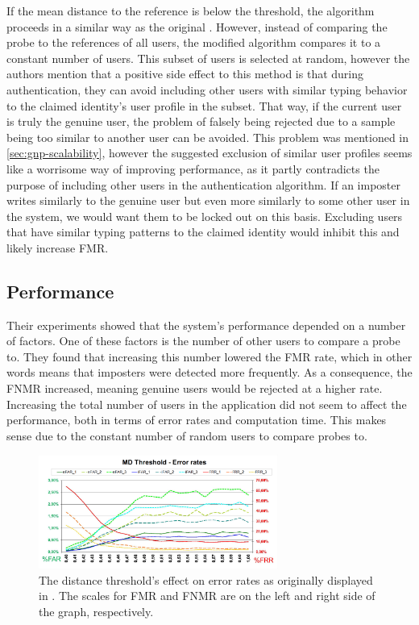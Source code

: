 \documentclass[informationsecurity]{gucmasterproject}
\begin{document}
If the mean distance to the reference is below the threshold, the algorithm proceeds in a similar way as the original \cite{gnp}.
However, instead of comparing the probe to the references of all users, the modified algorithm compares it to a constant number of users.
This subset of users is selected at random, however the authors mention that a positive side effect to this method is that during authentication, they can avoid including other users with similar typing behavior to the claimed identity's user profile in the subset. 
That way, if the current user is truly the genuine user, the problem of falsely being rejected due to a sample being too similar to another user can be avoided. 
This problem was mentioned in \cref{sec:gnp-scalability}, however the suggested exclusion of similar user profiles seems like a worrisome way of improving performance, as it partly contradicts the purpose of including other users in the authentication algorithm.
If an imposter writes similarly to the genuine user but even more similarly to some other user in the system, we would want them to be locked out on this basis.
Excluding users that have similar typing patterns to the claimed identity would inhibit this and likely increase FMR.

\subsection{Performance}
Their experiments showed that the system's performance depended on a number of factors.
One of these factors is the number of other users to compare a probe to.
They found that increasing this number lowered the FMR rate, which in other words means that imposters were detected more frequently.
As a consequence, the FNMR increased, meaning genuine users would be rejected at a higher rate.
Increasing the total number of users in the application did not seem to affect the performance, both in terms of error rates and computation time.
This makes sense due to the constant number of random users to compare probes to.

\begin{figure}[h]
    \centering
    \includegraphics[width=0.7\textwidth]{messerman/messerman_thresh1}
    \caption{The distance threshold's effect on error rates as originally displayed in \cite{Messerman}. The scales for FMR and FNMR are on the left and right side of the graph, respectively.}
    \label{fig:messerman-threshold}
\end{figure}
\end{document}
